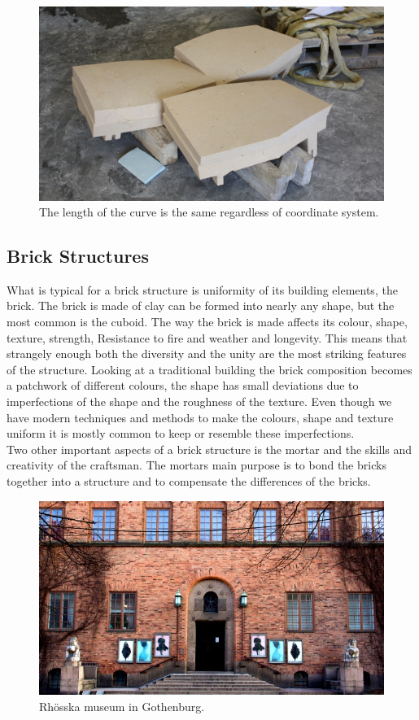 \begin{figure}[H]
\centering
\includegraphics[height=0.4\linewidth ]{figure/Introduction/blockStereo.jpg}
\caption{The length of the curve is the same regardless of coordinate system.}
\end{figure}


  

\subsection{Brick Structures}

What is typical for a brick structure is uniformity of its building elements, the brick. The brick is made of clay can be formed into nearly any shape, but the most common is the cuboid. The way the brick is made affects its colour, shape, texture, strength, Resistance to fire and weather and longevity. This means that strangely enough both the diversity and the unity are the most striking features of the structure. Looking at a traditional building the brick composition becomes a patchwork of different colours, the shape has small deviations due to imperfections of the shape and the roughness of the texture. Even though we have modern techniques and methods to make the colours, shape and texture uniform it is mostly common to keep or resemble these imperfections.\\
Two other important aspects of a brick structure is the mortar and the skills and creativity of the craftsman. The mortars main purpose is to bond the bricks together into a structure and to compensate the differences of the bricks. 

\begin{figure}[H]
\centering
\includegraphics[width=1.0\linewidth ]{figure/Introduction/Rohsska.jpg}
\caption{Rhösska museum in Gothenburg.}
\end{figure}







